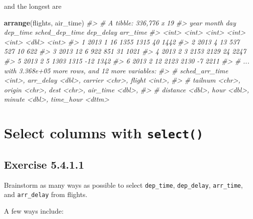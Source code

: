 \documentclass[]{book}
\newenvironment{Shaded}{\begin{snugshade}}{\end{snugshade}}
\newcommand{\CommentTok}[1]{\textcolor[rgb]{0.56,0.35,0.01}{\textit{#1}}}
\newcommand{\KeywordTok}[1]{\textcolor[rgb]{0.13,0.29,0.53}{\textbf{#1}}}
\newcommand{\NormalTok}[1]{#1}
\theoremstyle{plain}
\theoremstyle{remark}
\begin{document}
and the longest are

\begin{Shaded}
\begin{Highlighting}[]
\KeywordTok{arrange}\NormalTok{(flights, air_time)}
\CommentTok{#> # A tibble: 336,776 x 19}
\CommentTok{#>    year month   day dep_time sched_dep_time dep_delay arr_time}
\CommentTok{#>   <int> <int> <int>    <int>          <int>     <dbl>    <int>}
\CommentTok{#> 1  2013     1    16     1355           1315        40     1442}
\CommentTok{#> 2  2013     4    13      537            527        10      622}
\CommentTok{#> 3  2013    12     6      922            851        31     1021}
\CommentTok{#> 4  2013     2     3     2153           2129        24     2247}
\CommentTok{#> 5  2013     2     5     1303           1315       -12     1342}
\CommentTok{#> 6  2013     2    12     2123           2130        -7     2211}
\CommentTok{#> # ... with 3.368e+05 more rows, and 12 more variables:}
\CommentTok{#> #   sched_arr_time <int>, arr_delay <dbl>, carrier <chr>, flight <int>,}
\CommentTok{#> #   tailnum <chr>, origin <chr>, dest <chr>, air_time <dbl>,}
\CommentTok{#> #   distance <dbl>, hour <dbl>, minute <dbl>, time_hour <dttm>}
\end{Highlighting}
\end{Shaded}

\hypertarget{select-columns-with-select}{%
\section{\texorpdfstring{Select columns with
\texttt{select()}}{Select columns with select()}}\label{select-columns-with-select}}

\hypertarget{exercise-5.4.1.1}{%
\subsection*{\texorpdfstring{Exercise
{5.4.1.1}}{Exercise 5.4.1.1}}\label{exercise-5.4.1.1}}

Brainstorm as many ways as possible to select \texttt{dep\_time},
\texttt{dep\_delay}, \texttt{arr\_time}, and \texttt{arr\_delay} from
flights.

A few ways include:
\end{document}
